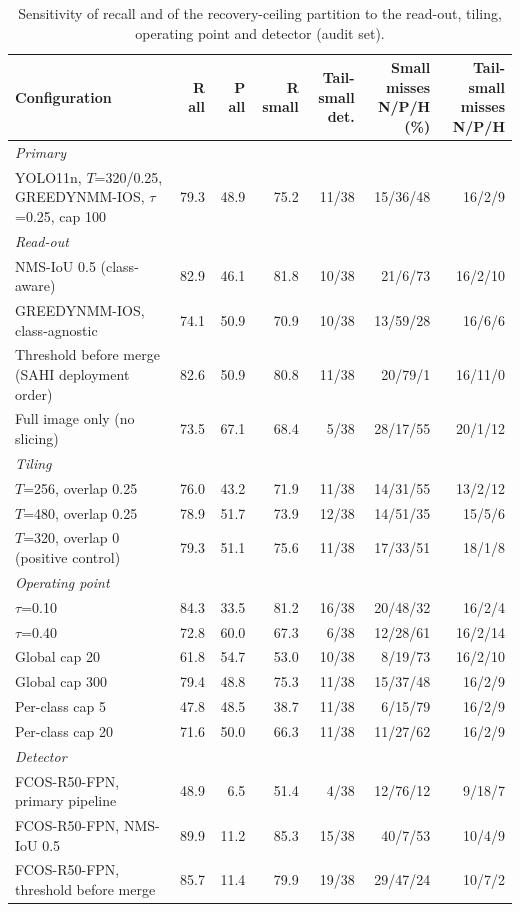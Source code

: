 \begin{table}[!htbp]
\fontsize{6pt}{7pt}\selectfont
\caption{Sensitivity of recall and of the recovery-ceiling partition to the read-out, tiling, operating point and detector (audit set).}
\label{tab:sensitivity}
\begin{tabular*}{\textwidth}{@{\extracolsep{\fill}}p{3.6cm}rrrrrr}
\toprule
Configuration & R all & P all & R small & \shortstack{Tail-small\\det.} & \shortstack{Small misses\\N/P/H (\%)} & \shortstack{Tail-small\\misses N/P/H} \\
\midrule
\multicolumn{7}{l}{\textit{Primary}} \\
YOLO11n, $T$=320/0.25, GREEDYNMM-IOS, $\tau$=0.25, cap 100 & 79.3 & 48.9 & 75.2 & 11/38 & 15/36/48 & 16/2/9 \\
\multicolumn{7}{l}{\textit{Read-out}} \\
NMS-IoU 0.5 (class-aware) & 82.9 & 46.1 & 81.8 & 10/38 & 21/6/73 & 16/2/10 \\
GREEDYNMM-IOS, class-agnostic & 74.1 & 50.9 & 70.9 & 10/38 & 13/59/28 & 16/6/6 \\
Threshold before merge (SAHI deployment order) & 82.6 & 50.9 & 80.8 & 11/38 & 20/79/1 & 16/11/0 \\
Full image only (no slicing) & 73.5 & 67.1 & 68.4 & 5/38 & 28/17/55 & 20/1/12 \\
\multicolumn{7}{l}{\textit{Tiling}} \\
$T$=256, overlap 0.25 & 76.0 & 43.2 & 71.9 & 11/38 & 14/31/55 & 13/2/12 \\
$T$=480, overlap 0.25 & 78.9 & 51.7 & 73.9 & 12/38 & 14/51/35 & 15/5/6 \\
$T$=320, overlap 0 (positive control) & 79.3 & 51.1 & 75.6 & 11/38 & 17/33/51 & 18/1/8 \\
\multicolumn{7}{l}{\textit{Operating point}} \\
$\tau$=0.10 & 84.3 & 33.5 & 81.2 & 16/38 & 20/48/32 & 16/2/4 \\
$\tau$=0.40 & 72.8 & 60.0 & 67.3 & 6/38 & 12/28/61 & 16/2/14 \\
Global cap 20 & 61.8 & 54.7 & 53.0 & 10/38 & 8/19/73 & 16/2/10 \\
Global cap 300 & 79.4 & 48.8 & 75.3 & 11/38 & 15/37/48 & 16/2/9 \\
Per-class cap 5 & 47.8 & 48.5 & 38.7 & 11/38 & 6/15/79 & 16/2/9 \\
Per-class cap 20 & 71.6 & 50.0 & 66.3 & 11/38 & 11/27/62 & 16/2/9 \\
\multicolumn{7}{l}{\textit{Detector}} \\
FCOS-R50-FPN, primary pipeline & 48.9 & 6.5 & 51.4 & 4/38 & 12/76/12 & 9/18/7 \\
FCOS-R50-FPN, NMS-IoU 0.5 & 89.9 & 11.2 & 85.3 & 15/38 & 40/7/53 & 10/4/9 \\
FCOS-R50-FPN, threshold before merge & 85.7 & 11.4 & 79.9 & 19/38 & 29/47/24 & 10/7/2 \\
\bottomrule
\end{tabular*}
\end{table}
